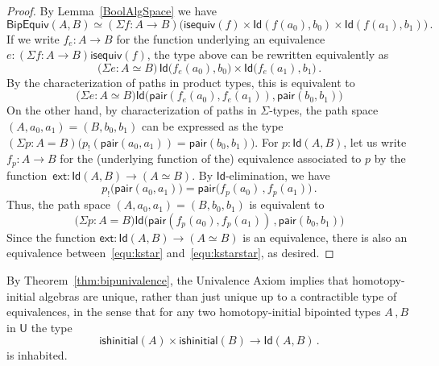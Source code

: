 \documentclass[reqno,10pt,a4paper,oneside]{amsart}
\numberwithin{equation}{section}
\theoremstyle{mythm}
\theoremstyle{mydef}
\theoremstyle{myrmk}
\newcommand{\co}{\colon}
\newcommand{\isequiv}{\mathsf{isequiv}}
\newcommand{\ext}{\mathsf{ext}}
\newcommand{\pair}{\mathsf{pair}}
\newcommand{\Id}{\mathsf{Id}}
\newcommand{\UU}{\mathsf{U}}
\begin{document}
\begin{proof} By Lemma~\ref{BoolAlgSpace} we have
\[
 \mathsf{BipEquiv}(A,B) \simeq (\Sigma f \co A \to B) \big( \isequiv(f) \times  \Id (f(a_0),  b_0 ) \times \Id ( f(a_1) , b_1) \big) \, . 
\]
If we write $f_e \co A \to B$ for the function underlying an equivalence $e \co (\Sigma f \co A \to B) \isequiv(f)$, the type above can be 
rewritten equivalently as 
\[ 
\big(\Sigma e : A \simeq B \big) \,  \Id \big(f_e(a_0),  b_0\big) \times \Id \big( f_e(a_1) , b_1\big) \, .
\]
By the characterization of paths in product types, this is equivalent to
\begin{equation}
\label{equ:kstar}
 \big(\Sigma e : A \simeq B \big) \Id \big(   \pair( f_e ( a_0 ) , f_e ( a_1 )  )   ,  \pair(b_0, b_1)  \big)
 \end{equation}
On the other hand, by characterization of paths in $\Sigma$-types, the path space $(A,a_0,a_1) = (B,b_0,b_1)$ can be expressed as the type
$(\Sigma p : A = B) \big( p_{!} (\pair(a_0,a_1)) = \pair(b_0,b_1) \big)$. For $p \co \Id(A,B)$, let us write $f_p \co A \to B$ for the (underlying function of the) 
equivalence associated to $p$ by the function~$\ext \co \Id(A,B) \to (A \simeq B)$. By $\Id$-elimination, we have
\[
p_{!} \big( \pair(a_0, a_1) \big) =  \pair \big(  f_p ( a_0) \, , f_p ( a_1) \big)  \, .
\]
Thus, the path space $(A, a_0, a_1) = (B, b_0, b_1)$ is equivalent to 
\begin{equation}
\label{equ:kstarstar}
\big(\Sigma p : A = B \big) 
\Id \big( \pair( f_p ( a_0) , f_p (a_1) )  \, ,  \pair(b_0,b_1) \big)
\end{equation}
Since the function $\ext \co \Id(A,B) \to (A \simeq B)$ is an equivalence, there is also an  equivalence between~\eqref{equ:kstar}
and~\eqref{equ:kstarstar}, as desired.
\end{proof} 

By Theorem~\ref{thm:bipunivalence}, the Univalence Axiom implies that homotopy-initial algebras are unique, rather than just unique up to a contractible type of equivalences, in the sense that for any two homotopy-initial bipointed types $A \, , B$ in $\UU$ the type
\[ 
\mathsf{ishinitial}(A) \times \mathsf{ishinitial}(B) \to \Id(A,B) \, .
\] 
is inhabited. 



\newpage
\end{document}
